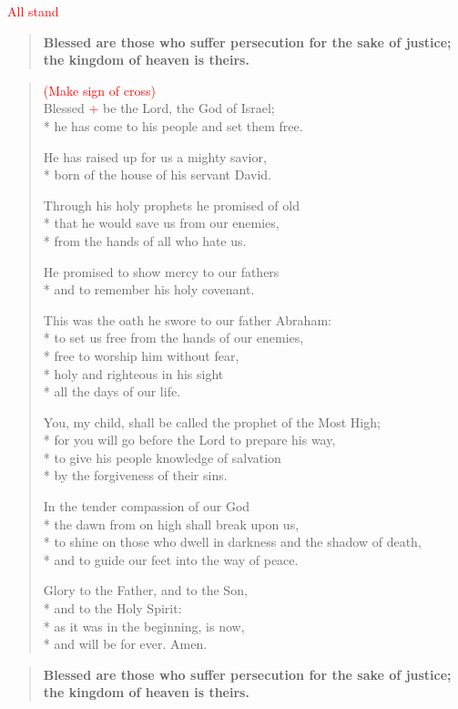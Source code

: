 \documentclass[letterpaper,14pt]{extarticle}
\newcommand{\side}[1]{\flagverse{\textcolor{red}{\textit{#1}}:}}
\newcommand{\rednote}[1]{\textcolor{red}{#1}}
\newlength{\oldindent}
\newcommand{\antiphon}[2]{
	\setlength{\oldindent}{\vindent}
	\setlength{\vindent}{0em}
	\begin{verse}
	\side{#1} \textbf{#2}
	\end{verse}
	\setlength{\vindent}{\oldindent}
}
\begin{document}
\rednote{All stand}
\antiphon{Leader}{Blessed are those who suffer persecution for the sake of justice; the kingdom of heaven is theirs.}
\begin{verse}
\rednote{(Make sign of cross)}\\
\side{All} Blessed \rednote{+} be the Lord, the God of Israel; \\*
he has come to his people and set them free.

He has raised up for us a mighty savior, \\*
born of the house of his servant David.

Through his holy prophets he promised of old \\*
  that he would save us from our enemies, \\*
  from the hands of all who hate us.

He promised to show mercy to our fathers \\*
and to remember his holy covenant.

This was the oath he swore to our father Abraham: \\*
to set us free from the hands of our enemies, \\*
free to worship him without fear, \\*
holy and righteous in his sight \\*
   all the days of our life.

You, my child, shall be called the prophet of the Most High; \\*
for you will go before the Lord to prepare his way, \\*
to give his people knowledge of salvation \\*
by the forgiveness of their sins.

In the tender compassion of our God \\*
the dawn from on high shall break upon us, \\*
to shine on those who dwell in darkness and the shadow of death, \\*
and to guide our feet into the way of peace.

Glory to the Father, and to the Son, \\*
and to the Holy Spirit: \\*
as it was in the beginning, is now, \\*
and will be for ever. Amen.
\end{verse}
\antiphon{All}{Blessed are those who suffer persecution for the sake of justice; the kingdom of heaven is theirs.}
\end{document}
